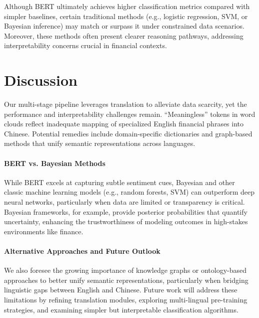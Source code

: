 \documentclass[12pt]{article}
\begin{document}
Although BERT ultimately achieves higher classification metrics compared with simpler baselines, certain traditional methods (e.g., logistic regression, SVM, or Bayesian inference) may match or surpass it under constrained data scenarios. Moreover, these methods often present clearer reasoning pathways, addressing interpretability concerns crucial in financial contexts.

\section{Discussion}
\label{sec:discussion}

Our multi-stage pipeline leverages translation to alleviate data scarcity, yet the performance and interpretability challenges remain. “Meaningless” tokens in word clouds reflect inadequate mapping of specialized English financial phrases into Chinese. Potential remedies include domain-specific dictionaries and graph-based methods that unify semantic representations across languages.

\paragraph{BERT vs. Bayesian Methods}
While BERT excels at capturing subtle sentiment cues, Bayesian and other classic machine learning models (e.g., random forests, SVM) can outperform deep neural networks, particularly when data are limited or transparency is critical. Bayesian frameworks, for example, provide posterior probabilities that quantify uncertainty, enhancing the trustworthiness of modeling outcomes in high-stakes environments like finance.

\paragraph{Alternative Approaches and Future Outlook}
We also foresee the growing importance of knowledge graphs or ontology-based approaches to better unify semantic representations, particularly when bridging linguistic gaps between English and Chinese. Future work will address these limitations by refining translation modules, exploring multi-lingual pre-training strategies, and examining simpler but interpretable classification algorithms.

\end{document}
